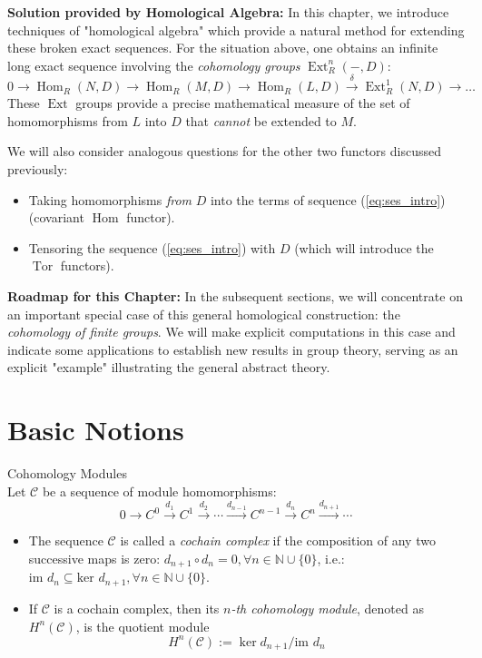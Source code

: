 \noindent\textbf{Solution provided by Homological Algebra:} 
In this chapter, we introduce techniques of "homological algebra" which provide a natural method for extending these broken exact sequences. For the situation above, one obtains an infinite long exact sequence involving the \textit{cohomology groups} $\operatorname{Ext}^n_R(-, D)$:
\begin{equation}
    0 \to \operatorname{Hom}_R(N, D) \to \operatorname{Hom}_R(M, D) \to \operatorname{Hom}_R(L, D) \xrightarrow{\delta} \operatorname{Ext}^1_R(N, D) \to \dots
\end{equation}
These $\operatorname{Ext}$ groups provide a precise mathematical measure of the set of homomorphisms from $L$ into $D$ that \textit{cannot} be extended to $M$. 

We will also consider analogous questions for the other two functors discussed previously: 
\begin{itemize}
    \item Taking homomorphisms \textit{from} $D$ into the terms of sequence (\ref{eq:ses_intro}) (covariant $\operatorname{Hom}$ functor).
    \item Tensoring the sequence (\ref{eq:ses_intro}) with $D$ (which will introduce the $\operatorname{Tor}$ functors).
\end{itemize}


\noindent\textbf{Roadmap for this Chapter:} 
In the subsequent sections, we will concentrate on an important special case of this general homological construction: the \textit{cohomology of finite groups}. We will make explicit computations in this case and indicate some applications to establish new results in group theory, serving as an explicit "example" illustrating the general abstract theory.


\section{Basic Notions}

\begin{definition}{Cohomology Modules}\\
Let $\mathcal{C}$ be a sequence of module homomorphisms:
\[
0 \to C^0 \overset{d_1}{\longrightarrow} C^1 \overset{d_2}{\longrightarrow} \cdots \overset{d_{n-1}}{\longrightarrow} C^{n-1} \overset{d_n}{\longrightarrow} C^n \overset{d_{n+1}}{\longrightarrow} \cdots
\]
\begin{itemize}
    \item The sequence $\mathcal   C$ is called a \textit{cochain complex} if the composition of any two successive maps is zero: $d_{n+1} \circ d_n=0, \forall n\in \mathbb{N} \cup \{0\}$, i.e.: $\text{im }d_n \subseteq \text{ker }d_{n+1}, \forall n\in \mathbb{N} \cup \{0\}$.

    \item If $\mathcal{C}$ is a cochain complex, then its \textit{$n$-th cohomology module}, denoted as $H^n(\mathcal{C})$, is the quotient module
    \[
    H^n (\mathcal{C}) := \ker d_{n+1} / \text{im }d_n
    \]
\end{itemize}
\end{definition}

